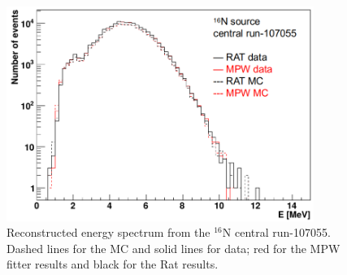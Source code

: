 \begin{figure}[htbp]
	\centering
	\includegraphics[width=10cm]{N16_reconE_107055.png}
	\caption{Reconstructed energy spectrum from the $^{16}$N central run-107055. Dashed lines for the MC and solid lines for data; red for the MPW fitter results and black for the Rat results.}
	\label{N16energy}
\end{figure}

